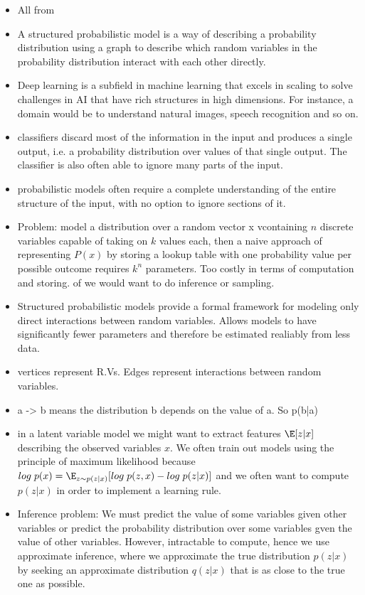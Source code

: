 \begin{itemize}
    \item All from \cite[Chp.~16]{Goodfellow-et-al-2016}
    \item A structured probabilistic model is a way of describing a probability distribution using a graph to describe which random variables in the probability distribution interact with each other directly.
    \item Deep learning is a subfield in machine learning that excels in scaling to solve challenges in AI that have rich structures in high dimensions. For instance, a domain would be to understand natural images, speech recognition and so on.
    \item classifiers discard most of the information in the input and produces a single output, i.e. a probability distribution over values of that single output. The classifier is also often able to ignore many parts of the input.
    \item probabilistic models often require a complete understanding of the entire structure of the input, with no option to ignore sections of it.
    \item Problem: model a distribution over a random vector x vcontaining $n$ discrete variables capable of taking on $k$ values each, then a naive approach of representing $P(x)$ by storing a lookup table with one probability value per possible outcome requires $k^n$ parameters. Too costly in terms of computation and storing. of we would want to do inference or sampling.
    \item Structured probabilistic models provide a formal framework for modeling only direct interactions between random variables. Allows models to have significantly fewer parameters and therefore be estimated realiably from less data.
    \item vertices represent R.Vs. Edges represent interactions between random variables. 
    \item a -> b means the distribution b depends on the value of a. So p(b|a)
    \item in a latent variable model we might want to extract features $\E[z|x]$ describing the observed variables $x$. We often train out models using the principle of maximum likelihood because $log \; p(x) = \E_{z \sim p(z|x)}[log \; p(z,x) - log \;p(z|x)]$ and we often want to compute $p(z|x)$ in order to implement a learning rule. 
    \item Inference problem: We must predict the value of some variables given other variables or predict the probability distribution over some variables gven the value of other variables. However, intractable to compute, hence we use approximate inference, where we approximate the true distribution $p(z|x)$ by seeking an approximate distribution $q(z|x)$ that is as close to the true one as possible.
\end{itemize}

